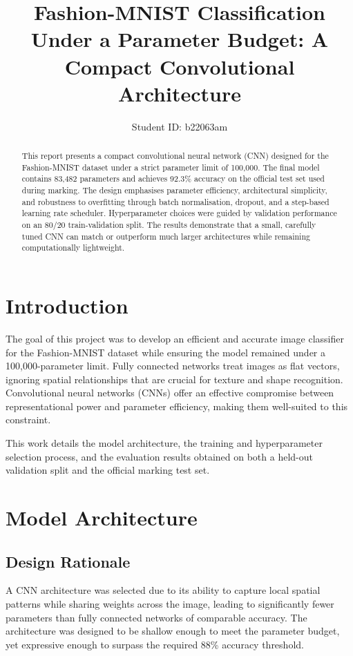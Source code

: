 \documentclass[11pt]{article}
\title{\textbf{Fashion-MNIST Classification Under a Parameter Budget: 
A Compact Convolutional Architecture}}
\author{Student ID: b22063am}
\date{}
\begin{document}
\maketitle

\begin{abstract}
This report presents a compact convolutional neural network (CNN) designed for the Fashion-MNIST dataset under a strict parameter limit of 100,000. The final model contains 83,482 parameters and achieves 92.3\% accuracy on the official test set used during marking. The design emphasises parameter efficiency, architectural simplicity, and robustness to overfitting through batch normalisation, dropout, and a step-based learning rate scheduler. Hyperparameter choices were guided by validation performance on an 80/20 train-validation split. The results demonstrate that a small, carefully tuned CNN can match or outperform much larger architectures while remaining computationally lightweight.
\end{abstract}

\section{Introduction}

The goal of this project was to develop an efficient and accurate image classifier for the Fashion-MNIST dataset while ensuring the model remained under a 100,000-parameter limit. Fully connected networks treat images as flat vectors, ignoring spatial relationships that are crucial for texture and shape recognition. Convolutional neural networks (CNNs) offer an effective compromise between representational power and parameter efficiency, making them well-suited to this constraint.

This work details the model architecture, the training and hyperparameter selection process, and the evaluation results obtained on both a held-out validation split and the official marking test set.

\section{Model Architecture}

\subsection{Design Rationale}

A CNN architecture was selected due to its ability to capture local spatial patterns while sharing weights across the image, leading to significantly fewer parameters than fully connected networks of comparable accuracy. The architecture was designed to be shallow enough to meet the parameter budget, yet expressive enough to surpass the required 88\% accuracy threshold.
\end{document}
